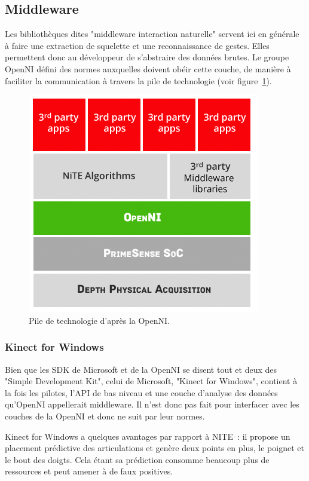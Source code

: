 
\subsection{Middleware}
Les bibliothèques dites "middleware interaction naturelle" servent ici en 
générale à faire une 
extraction de squelette et une reconnaissance de gestes. Elles permettent donc 
au développeur de s'abstraire des données brutes. Le groupe OpenNI défini 
des normes auxquelles doivent obéir cette couche, de 
manière à faciliter la communication à travers la pile de technologie (voir 
figure~\ref{fig:openni_technology_stack}).
\begin{figure}[h!]
\centering
\includegraphics[width=0.7\linewidth]{images/openni_technology_stack}
\caption{Pile de technologie d'après la OpenNI.}
\label{fig:openni_technology_stack}
\end{figure}


\subsubsection{Kinect for Windows}  
Bien que les SDK de Microsoft et de la OpenNI se disent tout et deux des 
"Simple Development Kit",
celui de Microsoft, "Kinect for Windows", contient à la fois les pilotes, 
l'API de bas niveau et une couche d'analyse des données qu'OpenNI appellerait 
middleware. Il n'est donc pas fait pour interfacer avec les couches de la 
OpenNI et donc ne suit par leur normes.

Kinect for Windows a quelques avantages par rapport à NITE~: il propose un
placement prédictive des articulations et genère deux points en plus, 
le poignet et le bout des doigts. Cela étant sa prédiction consomme beaucoup 
plus de ressources et peut amener à de faux positives.

